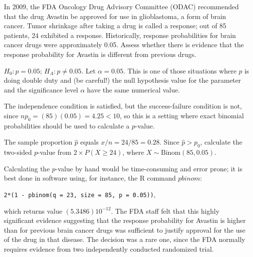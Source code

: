 \begin{example}{In 2009, the FDA Oncology Drug Advisory Committee (ODAC) recommended that the drug Avastin be approved for use in glioblastoma, a form of brain cancer. Tumor shrinkage after taking a drug is called a response; out of 85 patients, 24 exhibited a response. Historically, response probabilities for brain cancer drugs were approximately 0.05. Assess whether there is evidence that the response probability for Avastin is different from previous drugs. 		
}	

$H_0: p = 0.05$; $H_A: p \neq 0.05$. Let $\alpha = 0.05$. This is one of those situations where $p$ is doing double duty and (be careful!) the null hypothesis value for the parameter and the significance level $\alpha$ have the same numerical value. 

The independence condition is satisfied, but the success-failure condition is not, since $np_0 = (85)(0.05) = 4.25 < 10$, so this is a setting where exact binomial probabilities should be used to calculate a $p$-value.

The sample proportion $\hat{p}$ equals $x/n = 24/85 = 0.28$. Since $\hat{p} > p_0$, calculate the two-sided $p$-value from $2 \times P(X \geq 24)$, where $X \sim \text{Binom}(85, 0.05)$.

Calculating the $p$-value by hand would be time-consuming and error prone; it is best done in software using, for instance, the R command $pbinom$:

\texttt{2*(1 - pbinom(q = 23, size = 85, p = 0.05))},

which returns value $(5.3486)10^{-12}$.  The FDA staff felt that this highly significant evidence suggesting that the response probability for Avastin is higher than for previous brain cancer drugs was sufficient to justify approval for the use of the drug in that disease.  The decision was a rare one, since the FDA normally requires evidence from two independently conducted randomized trial. 
	
\end{example}



